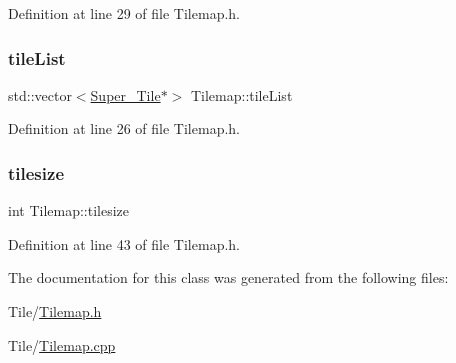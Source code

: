 Definition at line 29 of file Tilemap.\+h.

\hypertarget{class_tilemap_a49439fd862d03bdcc26d0c3b5156bc7a}{}\label{class_tilemap_a49439fd862d03bdcc26d0c3b5156bc7a} 
\subsubsection{\texorpdfstring{tile\+List}{tileList}}
{\footnotesize\ttfamily std\+::vector$<$\hyperlink{class_super___tile}{Super\+\_\+\+Tile}$\ast$$>$ Tilemap\+::tile\+List}



Definition at line 26 of file Tilemap.\+h.

\hypertarget{class_tilemap_a07d9546ed98a4da502902ebaa1d774ca}{}\label{class_tilemap_a07d9546ed98a4da502902ebaa1d774ca} 
\subsubsection{\texorpdfstring{tilesize}{tilesize}}
{\footnotesize\ttfamily int Tilemap\+::tilesize}



Definition at line 43 of file Tilemap.\+h.



The documentation for this class was generated from the following files\+:\begin{DoxyCompactItemize}
\item 
Tile/\hyperlink{_tilemap_8h}{Tilemap.\+h}\item 
Tile/\hyperlink{_tilemap_8cpp}{Tilemap.\+cpp}\end{DoxyCompactItemize}
